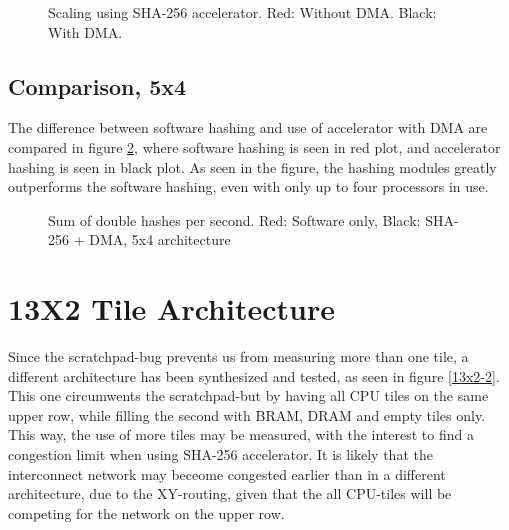 \begin{appendix}
\begin{figure}
	\caption{Scaling using SHA-256 accelerator. Red: Without DMA. Black: With DMA.}
	\label{fig:shadmacomp-scaling1}
\end{figure}

\subsection{Comparison, 5x4}

The difference between software hashing and use of accelerator with DMA are compared in figure \ref{fig:comp-plot1}, where software hashing is seen in red plot, and accelerator hashing is seen in black plot.
As seen in the figure, the hashing modules greatly outperforms the software hashing, even with only up to four processors in use.

\begin{figure}
	\caption{Sum of double hashes per second. Red: Software only, Black: SHA-256 + DMA, 5x4 architecture}
	\label{fig:comp-plot1}
\end{figure}

\section{13X2 Tile Architecture}

Since the scratchpad-bug prevents us from measuring more than one tile, a different architecture has been synthesized and tested, as seen in figure \ref{13x2-2}.
This one circumwents the scratchpad-but by having all CPU tiles on the same upper row, while filling the second with BRAM, DRAM and empty tiles only.
This way, the use of more tiles may be measured, with the interest to find a congestion limit when using SHA-256 accelerator.
It is likely that the interconnect network may beceome congested earlier than in a different architecture, due to the XY-routing, given that the all CPU-tiles will be competing for the network on the upper row.



\end{appendix}
